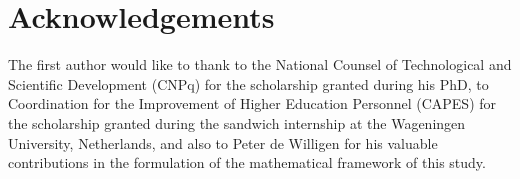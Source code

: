 \section*{Acknowledgements}

The first author would like to thank to the National Counsel of Technological and Scientific Development (CNPq) for the scholarship granted during his PhD, to Coordination for the Improvement of Higher Education Personnel (CAPES) for the scholarship granted during the sandwich internship at the Wageningen University, Netherlands, and also to Peter de Willigen for his valuable contributions in the formulation of the mathematical framework of this study.
